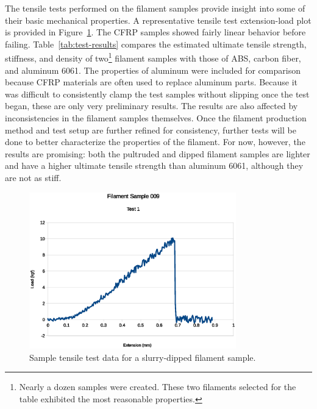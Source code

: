 \indent

The tensile tests performed on the filament samples provide insight into some of their basic mechanical properties. A representative tensile test extension-load plot is provided in Figure~\ref{fig:instron-sample}. The CFRP samples showed fairly linear behavior before failing. Table~\ref{tab:test-results} compares the estimated ultimate tensile strength, stiffness, and density of two\footnote{Nearly a dozen samples were created. These two filaments selected for the table exhibited the most reasonable properties.} filament samples with those of ABS, carbon fiber, and aluminum 6061. The properties of aluminum were included for comparison because CFRP materials are often used to replace aluminum parts. Because it was difficult to consistently clamp the test samples without slipping once the test began, these are only very preliminary results. The results are also affected by inconsistencies in the filament samples themselves. Once the filament production method and test setup are further refined for consistency, further tests will be done to better characterize the properties of the filament. For now, however, the results are promising: both the pultruded and dipped filament samples are lighter and have a higher ultimate tensile strength than aluminum 6061, although they are not as stiff.\\

\begin{figure}[htp]
    \centering
    \includegraphics[width=0.8\textwidth]{./figures/009T1-instron-data}
    \caption{Sample tensile test data for a slurry-dipped filament sample.}
    \label{fig:instron-sample}
\end{figure}

